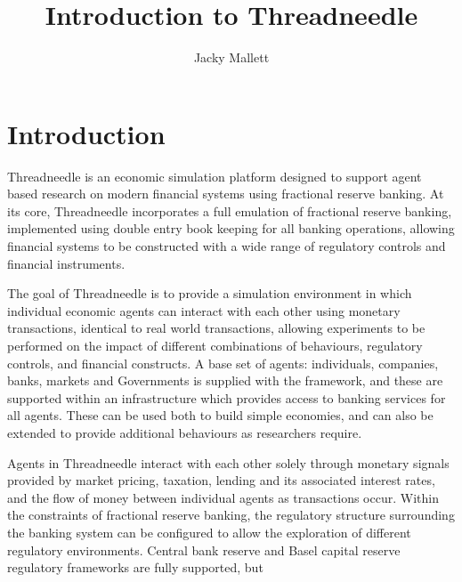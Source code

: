 \documentclass[10pt,oneside,openright, a4paper]{memoir}
\begin{document}
\title{Introduction to Threadneedle}
\author{Jacky Mallett}

\null\newpage


\mainmatter
\sloppy
\chapter{Introduction}
Threadneedle is an economic simulation platform designed 
to support agent based research on modern financial systems 
using fractional reserve banking. At its core, Threadneedle
incorporates a full emulation of fractional reserve banking, 
implemented using double entry book keeping for all banking operations,
allowing financial systems to be constructed with a wide range of 
regulatory controls and financial instruments.
\par
The goal of Threadneedle is to provide a simulation environment in which 
individual economic agents can interact with each other using monetary 
transactions, identical to real world transactions, allowing
experiments to be performed on the impact of different combinations
of behaviours, regulatory controls, and financial constructs.
A base set of agents: individuals, companies, banks, markets and
Governments is supplied with the framework, and these are supported 
within an infrastructure which provides access to banking services for
all agents. These can be used both to build 
simple economies, and can also be extended to provide additional 
behaviours as researchers require.
\par
Agents in Threadneedle interact with each other solely through monetary 
signals provided by market pricing, taxation, lending and its associated 
interest rates, and the flow of money between individual agents as transactions
occur.  Within the constraints of fractional reserve banking, the regulatory 
structure surrounding the banking system can be configured to allow the 
exploration of different regulatory environments. Central bank reserve 
and Basel capital reserve regulatory frameworks are fully supported, but 
\end{document}
